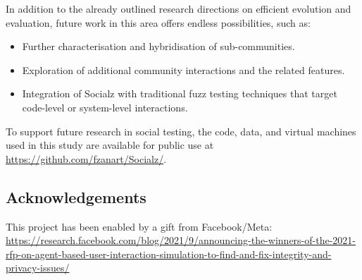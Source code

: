 \documentclass[dvipsnames,format=sigconf,anonymous=False,review=false, balance=false]{acmart}
\begin{document}
In addition to the already outlined research directions on efficient evolution and evaluation, future work in this area offers endless possibilities, such as: 
\begin{itemize}
    \item Further characterisation and hybridisation of sub-communities.
    \item Exploration of additional community interactions and the related features.
    \item Integration of Socialz with traditional fuzz testing techniques that target code-level or system-level interactions.
\end{itemize}

To support future research in social testing, the code, data, and virtual machines used in this study are available for public use at  \url{https://github.com/fzanart/Socialz/}.

\subsection*{Acknowledgements}

This project has been enabled by a gift from Facebook/Meta: \url{https://research.facebook.com/blog/2021/9/announcing-the-winners-of-the-2021-rfp-on-agent-based-user-interaction-simulation-to-find-and-fix-integrity-and-privacy-issues/}



\end{document}
